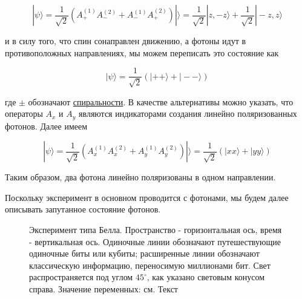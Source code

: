 \documentclass[main.tex]{subfiles}
\begin{document}
\begin{equation}\label{3.7}
	|\psi\rangle=\frac{1}{\sqrt{2}}\left(A_{+}^{(1)} A_{-}^{(2)}+A_{-}^{(1)} A_{+}^{(2)}\right)|\rangle=\frac{1}{\sqrt{2}}|z,-z\rangle+\frac{1}{\sqrt{2}}|-z, z\rangle
\end{equation}
            
и в силу того, что спин сонаправлен движению, а фотоны идут в противоположных направлениях, мы можем переписать это состояние как

\begin{equation}\label{3.8}
	|\psi\rangle=\frac{1}{\sqrt{2}}(|++\rangle+|--\rangle)
\end{equation}
       
где $\pm$ обозначают \href{https://en.wikipedia.org/wiki/Helicity_(particle_physics)}{спиральности}. В качестве альтернативы можно указать, что операторы $A_x$ и $A_y$ являются индикаторами создания линейно поляризованных фотонов. Далее имеем

\begin{equation}\label{3.9}
	|\psi\rangle=\frac{1}{\sqrt{2}}\left(A_{x}^{(1)} A_{x}^{(2)}+A_{y}^{(1)} A_{y}^{(2)}\right)|\rangle=\frac{1}{\sqrt{2}}(|x x\rangle+|y y\rangle)
\end{equation}

Таким образом, два фотона линейно поляризованы в одном направлении.

Поскольку эксперимент в основном проводится с фотонами, мы будем далее описывать запутанное состояние фотонов.

\begin{figure}[ht] %
	\begin{center}
		\caption{
		\label{i3.1} Эксперимент типа Белла. Пространство - горизонтальная ось, время - вертикальная ось. Одиночные линии обозначают путешествующие одиночные биты или кубиты; расширенные линии обозначают классическую информацию, переносимую миллионами бит. Свет распространяется под углом $45^\circ$, как указано световым конусом справа. Значение переменных: см. Текст}
	\end {center}
\end {figure}
\end{document}
